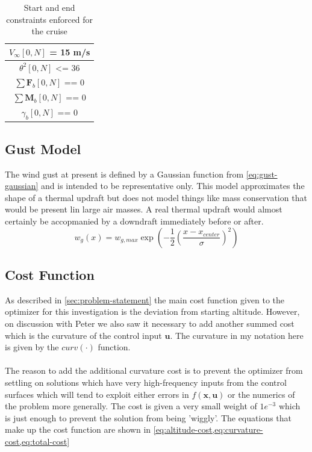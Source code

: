 \documentclass{article}
\begin{document}
\begin{table}[!h]
	\centering
	\caption{Start and end constraints enforced for the cruise}\label{tbl:cruise-start-end-conditions}
	\begin{tabular}{| c |}
		\hline
		\hline 
		$V_\infty[0,N]$ = 15 m/s\\
		\hline
		$\theta^2[0,N]$ <= 36 \\
		\hline
		$\sum \mathbf{F}_b[0,N]$ == 0\\
		\hline
		$\sum \mathbf{M}_b[0,N]$ == 0\\
		\hline
		$\gamma_b[0,N]$ == 0\\
		\hline
		\hline
	\end{tabular}
\end{table}


\subsection{Gust Model} \label{sec:gust-model}
The wind gust at present is defined by a Gaussian function from  \cref{eq:gust-gaussian} and is intended to be representative only. 
This model approximates the shape of a thermal updraft but does not model things like mass conservation that would be present lin large air masses.
A real thermal updraft would almost certainly be accopmanied by a downdraft immediately before or after.  
\begin{equation}
	w_g(x) = w_{g,max} \exp{\left( -\frac{1}{2} \left(\frac{x-x_{center}}{\sigma}\right)^2\right)} \label{eq:gust-gaussian}
\end{equation}

\subsection{Cost Function}

As described in \cref{sec:problem-statement} the main cost function given to the optimizer for this investigation is the deviation from starting altitude. 
However, on discussion with Peter we also saw it necessary to add another summed cost which is the curvature of the control input $\mathbf{u}$.
The curvature in my notation here is given by the $curv(\cdot)$ function.\\
\\
The reason to add the additional curvature cost is to prevent the optimizer from settling on solutions which have very high-frequency inputs from the control surfaces which will tend to exploit either errors in $f(\mathbf{x},\mathbf{u})$ or the numerics of the problem more generally. 
The cost is given a very small weight of $1e^{-3}$ which is just enough to prevent the solution from being 'wiggly'. The equations that make up the cost function are shown in \cref{eq:altitude-cost,eq:curvature-cost,eq:total-cost}\\
\end{document}
